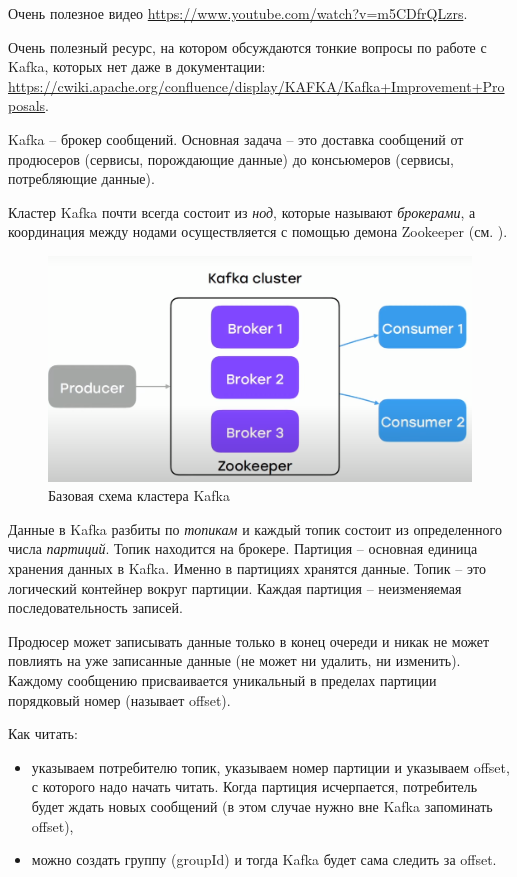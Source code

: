 \documentclass[%
	11pt,
	a4paper,
	utf8,
		]{article}
\begin{document}
Очень полезное видео \url{https://www.youtube.com/watch?v=m5CDfrQLzrs}.

Очень полезный ресурс, на котором обсуждаются тонкие вопросы по работе с Kafka, которых нет даже в документации: \url{https://cwiki.apache.org/confluence/display/KAFKA/Kafka+Improvement+Proposals}.

Kafka -- брокер сообщений. Основная задача -- это доставка сообщений от продюсеров (сервисы, порождающие данные) до консьюмеров (сервисы, потребляющие данные).

Кластер Kafka почти всегда состоит из \emph{нод}, которые называют \emph{брокерами}, а координация между нодами осуществляется с помощью демона Zookeeper (см. ).

\begin{figure}[h]
	\centering
	\includegraphics[scale=0.55]{figures/base_schema_kafka.png}
	\caption{ Базовая схема кластера Kafka }\label{fig:base_schema_kafka}
\end{figure}

Данные в Kafka разбиты по \emph{топикам} и каждый топик состоит из определенного числа \emph{партиций}. Топик находится на брокере. Партиция -- основная единица хранения данных в Kafka. Именно в партициях хранятся данные. Топик -- это логический контейнер вокруг партиции. Каждая партиция -- неизменяемая последовательность записей.

Продюсер может записывать данные только в конец очереди и никак не может повлиять на уже записанные данные (не может ни удалить, ни изменить). Каждому сообщению присваивается уникальный в пределах партиции порядковый номер (называет offset).

Как читать:
\begin{itemize}
	\item указываем потребителю топик, указываем номер партиции и указываем offset, с которого надо начать читать. Когда партиция исчерпается, потребитель будет ждать новых сообщений (в этом случае нужно вне Kafka запоминать offset),
	
	\item можно создать группу (groupId) и тогда Kafka будет сама следить за offset.
\end{itemize}
\end{document}
